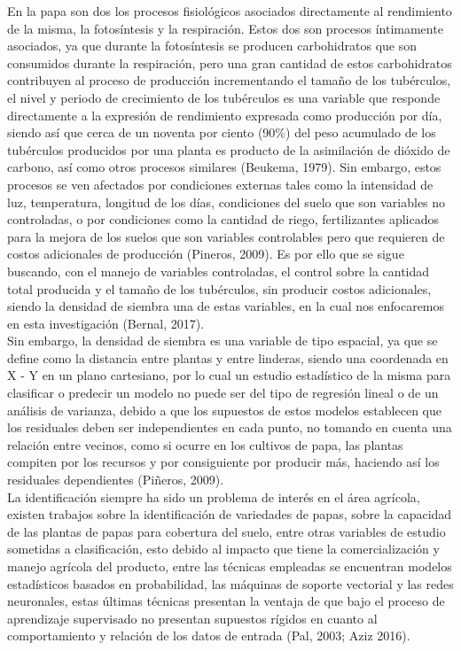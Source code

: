 En la papa son dos los procesos fisiológicos asociados directamente al rendimiento de la misma, la fotosíntesis y la respiración. Estos dos son procesos íntimamente asociados, ya que durante la fotosíntesis se producen carbohidratos que son consumidos durante la respiración, pero una gran cantidad de estos carbohidratos contribuyen al proceso de producción incrementando el tamaño de los tubérculos, el nivel y periodo de crecimiento de los tubérculos es una variable que responde directamente a la expresión de rendimiento expresada como producción por día, siendo así que cerca de un noventa por ciento (90\%) del peso acumulado de los tubérculos producidos por una planta es producto de la asimilación de dióxido de carbono, así como otros procesos similares (Beukema, 1979). Sin embargo, estos procesos se ven afectados por condiciones externas tales como la intensidad de luz, temperatura, longitud de los días, condiciones del suelo que son variables no controladas, o por condiciones como la cantidad de riego, fertilizantes aplicados para la mejora de los suelos que son variables controlables pero que requieren de costos adicionales de producción (Pineros, 2009). Es por ello que se sigue buscando, con el manejo de variables controladas,  el control sobre la cantidad total producida y el tamaño de los tubérculos,  sin producir costos adicionales, siendo la densidad de siembra una de estas variables, en la cual nos enfocaremos en esta investigación (Bernal, 2017).\\

Sin embargo,  la densidad de siembra es una variable de tipo espacial, ya que se define como la distancia entre plantas y entre linderas, siendo una coordenada en X - Y en un plano cartesiano, por lo cual un estudio estadístico de la misma para clasificar o predecir un modelo no puede ser del tipo de regresión lineal o de un análisis de varianza,  debido a que los supuestos de estos modelos establecen que los residuales deben ser independientes en cada punto, no tomando en cuenta una relación entre vecinos, como si ocurre en los cultivos de papa, las plantas compiten por los recursos y por consiguiente por producir más, haciendo así los residuales dependientes  (Pi\~neros, 2009). \\

La identificación siempre ha sido un problema de interés en el área agrícola, existen trabajos sobre la identificación de variedades de papas, sobre la capacidad de las plantas de papas para cobertura del suelo, entre otras variables de estudio sometidas a clasificación, esto debido al impacto que tiene la comercialización y manejo agrícola del producto, entre las técnicas empleadas se encuentran modelos estadísticos basados en probabilidad, las máquinas de soporte vectorial y las redes neuronales, estas últimas técnicas presentan la ventaja de que bajo el proceso de aprendizaje supervisado no presentan supuestos rígidos en cuanto al comportamiento y relación de los datos de entrada (Pal, 2003; Aziz 2016).\\

